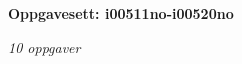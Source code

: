 \centerline{\bf Oppgavesett: i00511no-i00520no}
\vskip 10pt
\centerline{\it 10 oppgaver}\vskip 10pt
\vskip 10pt
